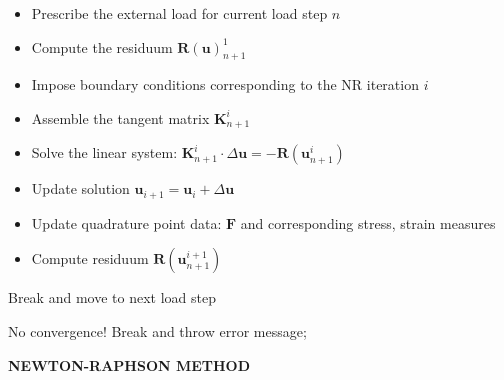 \begin{algorithm}[h]
\BlankLine
{}
{
	\begin{itemize}
	\item Prescribe the external load for current load step $n$\;
	\item Compute the residuum $\mathbf{R}(\mathbf{u})^1_{n+1}$\;
	\end{itemize}

	{
		{
		\begin{itemize}
		\item Impose boundary conditions corresponding to the NR iteration $i$\;
		\item Assemble the tangent matrix $\mathbf{K}^{i}_{n+1}$\;
		\item Solve the linear system: $\mathbf{K}^{i}_{n+1} \cdot \Delta\mathbf{u} = -\mathbf{R}(\mathbf{u}^i_{n+1})$\;
		\item Update solution $\mathbf{u}_{i+1} = \mathbf{u}_i + \Delta\mathbf{u}$\;
		\item Update quadrature point data: $\mathbf{F}$ and corresponding stress, strain measures\;
		\item Compute residuum $\mathbf{R}(\mathbf{u}^{i+1}_{n+1})$\;
		\end{itemize}
		}
		{Break and move to next load step\;}			
	}
	{No convergence! Break and throw error message;}
}
\caption{\textbf{NEWTON-RAPHSON METHOD}}
\label{alg:2.1}
\end{algorithm} \par

